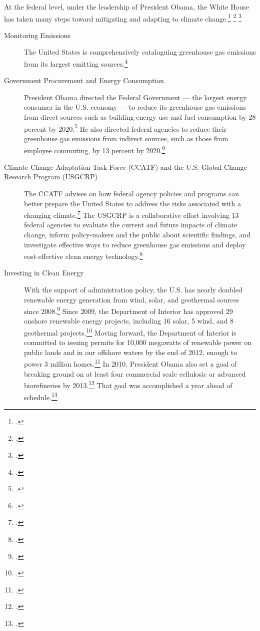 \documentclass[10pt]{article}
\begin{document}
At the federal level, under the leadership of President Obama, the White House has taken many steps toward mitigating and adapting to climate change.\footcite[][]{WHcc2013} \footcite[][]{WHadaptation2013} \footcite[][]{WHenergy}
\begin{description}
	\item [Monitoring Emissions] The United States is comprehensively cataloguing greenhouse gas emissions from its largest emitting sources.\footcite[][]{GHGReporting}
	\item [Government Procurement and Energy Consumption] President Obama directed the Federal Government --- the largest energy consumer in the U.S. economy --- to reduce its greenhouse gas emissions from direct sources such as building energy use and fuel consumption by 28 percent by 2020.\footcite[][]{FedEmissionReduction2010} He also directed federal agencies to reduce their greenhouse gas emissions from indirect sources, such as those from employee commuting, by 13 percent by 2020.\footcite[][]{FedEmissionReduction2010}
	\item [Climate Change Adaptation Task Force (CCATF) and the U.S. Global Change Research Program (USGCRP)] The CCATF advises on how federal agency policies and programs can better prepare the United States to address the risks associated with a changing climate.\footcite[][]{WHadaptation2013} The USGCRP is a collaborative effort involving 13 federal agencies to evaluate the current and future impacts of climate change, inform policy-makers and the public about scientific findings, and investigate effective ways to reduce greenhouse gas emissions and deploy cost-effective clean energy technology.\footcite[][]{USGCRP}
	\item [Investing in Clean Energy] With the support of administration policy, the U.S. has nearly doubled renewable energy generation from wind, solar, and geothermal sources since 2008.\footcite[][]{WHEnergyStrategy} Since 2009, the Department of Interior has approved 29 onshore renewable energy projects, including 16 solar, 5 wind, and 8 geothermal projects.\footcite[][]{WHEnergyStrategy} Moving forward, the Department of Interior is committed to issuing permits for 10,000 megawatts of renewable power on public lands and in our offshore waters by the end of 2012, enough to power 3 million homes.\footcite[][]{DOIWindPower} In 2010, President Obama also set a goal of breaking ground on at least four commercial scale cellulosic or advanced biorefineries by 2013.\footcite[][]{WHEnergyStrategy} That goal was accomplished a year ahead of schedule.\footcite[][]{WHEnergyStrategy}

\end{description}
\end{document}
